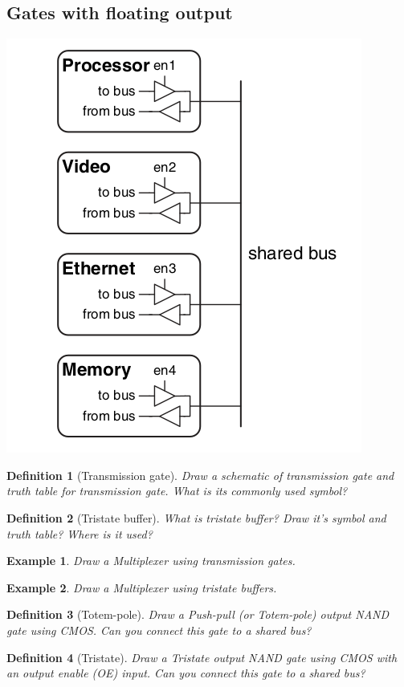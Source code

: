 \documentclass{article}
\newtheorem{example}{Example}
\newtheorem{definition}{Definition}
\begin{document}
\subsection{Gates with floating output}
\includegraphics[width=0.4\linewidth]{fig/fig2.42-tristate-bus.png}

\begin{definition}[Transmission gate]
  Draw a schematic of transmission gate and truth table for transmission gate.
  What is its commonly used symbol?
\end{definition}
\vspace{10em}


\begin{definition}[Tristate buffer]
  What is tristate buffer? Draw it's symbol and truth table? Where is it used?
\end{definition}
\vspace{10em}

\begin{example}
Draw a Multiplexer using transmission gates.
\end{example}
\vspace{10em}

\begin{example}
  Draw a Multiplexer using tristate buffers.
\end{example}
\vspace{10em}


\begin{definition}[Totem-pole]
  Draw a Push-pull (or Totem-pole) output NAND gate using CMOS. Can you connect
  this gate to a shared bus?
\end{definition}
\vspace{10em}

\begin{definition}[Tristate]
  Draw a Tristate output NAND gate using CMOS with an output enable (OE) input.
  Can you connect this gate to a shared bus?
\end{definition}
\vspace{10em}
\end{document}
